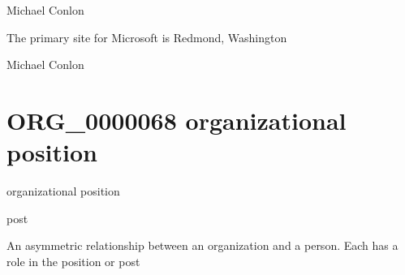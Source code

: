 \documentclass[letterpaper,10pt,english]{sphinxmanual}
\begin{document}
\begin{sphinxShadowBox}

\sphinxAtStartPar
Michael Conlon 
\end{sphinxShadowBox}

\begin{sphinxShadowBox}

\sphinxAtStartPar
The primary site for Microsoft is Redmond, Washington
\end{sphinxShadowBox}

\begin{sphinxShadowBox}

\sphinxAtStartPar
Michael Conlon 
\end{sphinxShadowBox}
\begin{quote}
\label{\detokenize{doc-ORG_0000068:org-0000068}}\label{\detokenize{doc-ORG_0000068:organizational-position}}\label{\detokenize{doc-ORG_0000068:org-0000068}}
\ignorespaces \end{quote}


\section{ORG\_0000068 \sphinxhyphen{} organizational position}
\label{\detokenize{doc-ORG_0000068:org-0000068-organizational-position}}\label{\detokenize{doc-ORG_0000068:index-0}}\label{\detokenize{doc-ORG_0000068::doc}}
\begin{sphinxShadowBox}

\sphinxAtStartPar
organizational position
\end{sphinxShadowBox}

\begin{sphinxShadowBox}

\sphinxAtStartPar
post
\end{sphinxShadowBox}

\begin{sphinxShadowBox}

\sphinxAtStartPar
An asymmetric relationship between an organization and a person.  Each has a role in the position or post
\end{sphinxShadowBox}
\end{document}
